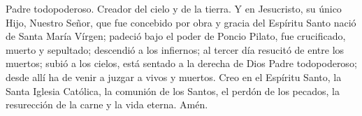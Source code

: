 Padre todopoderoso. Creador del cielo y de la tierra. Y en Jesucristo, su único Hijo, Nuestro Señor,
que fue concebido por obra y gracia del Espíritu Santo nació de Santa María Vírgen; padeció bajo el poder de Poncio Pilato,
fue crucificado, muerto y sepultado; descendió a los infiernos; al tercer día resucitó de entre los muertos; subió a los cielos,
está sentado a la derecha de Dios Padre todopoderoso; desde allí ha de venir a juzgar a vivos y muertos.
Creo en el Espíritu Santo, la Santa Iglesia Católica, la comunión de los Santos, el perdón de los pecados,
la resurección de la carne y la vida eterna. Amén.